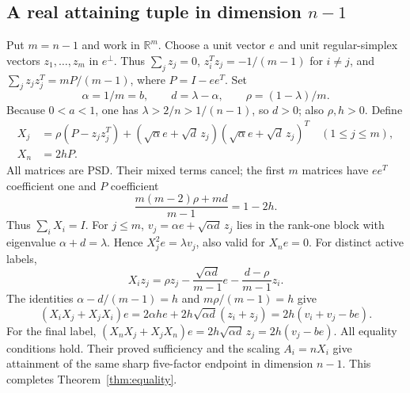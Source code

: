 \documentclass[11pt]{article}
\newcommand{\R}{\mathbb R}
\begin{document}
\subsection{A real attaining tuple in dimension \texorpdfstring{$n-1$}{n-1}}
Put $m=n-1$ and work in $\R^m$. Choose a unit vector $e$ and
unit regular-simplex vectors $z_1,\ldots,z_m$ in $e^\perp$.
Thus $\sum_jz_j=0$, $z_i^Tz_j=-1/(m-1)$ for $i\ne j$, and
$\sum_jz_jz_j^T=mP/(m-1)$, where $P=I-ee^T$.
Set
\[
 \alpha=1/m=b,\qquad d=\lambda-\alpha,\qquad
 \rho=(1-\lambda)/m.
\]
Because $0<a<1$, one has $\lambda>2/n>1/(n-1)$, so $d>0$;
also $\rho,h>0$. Define
\begin{align}
 X_j&=\rho(P-z_jz_j^T)
 +(\sqrt\alpha e+\sqrt d\,z_j)
   (\sqrt\alpha e+\sqrt d\,z_j)^T \quad(1\le j\le m),\nonumber\\
 X_n&=2hP.\label{eq:minimum-family}
\end{align}
All matrices are PSD. Their mixed terms cancel; the first $m$ matrices
have $ee^T$ coefficient one and $P$ coefficient
\[
 \frac{m(m-2)\rho+md}{m-1}=1-2h.
\]
Thus $\sum_iX_i=I$. For $j\le m$,
$v_j=\alpha e+\sqrt{\alpha d}\,z_j$ lies in the rank-one block
with eigenvalue $\alpha+d=\lambda$. Hence
$X_j^2e=\lambda v_j$, also valid for $X_ne=0$.
For distinct active labels,
\[
 X_i z_j=\rho z_j-\frac{\sqrt{\alpha d}}{m-1}e
                    -\frac{d-\rho}{m-1}z_i.
\]
The identities $\alpha-d/(m-1)=h$ and $m\rho/(m-1)=h$ give
\[
 (X_iX_j+X_jX_i)e
 =2\alpha he+2h\sqrt{\alpha d}(z_i+z_j)
 =2h(v_i+v_j-be).
\]
For the final label,
$(X_nX_j+X_jX_n)e=2h\sqrt{\alpha d}\,z_j=2h(v_j-be)$.
All equality conditions hold. Their proved sufficiency and the scaling
$A_i=nX_i$ give attainment of the same sharp five-factor endpoint in
dimension $n-1$. This completes Theorem~\ref{thm:equality}.
\end{document}
